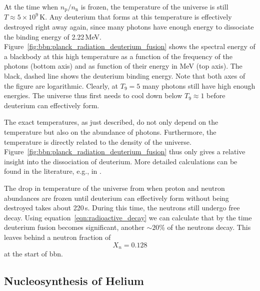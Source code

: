 At the time when $n_\mathrm{p}/n_\mathrm{n}$ is frozen, the temperature of the universe is still $T\approx 5\times 10^{9}$\,K. Any deuterium that forms at this temperature is effectively destroyed right away again, since many photons have enough energy to dissociate the binding energy of 2.22\,MeV. Figure~\ref{fig:bbn:planck_radiation_deuterium_fusion} shows the spectral energy of a blackbody at this high temperature as a function of the frequency of the photons (bottom axis) and as function of their energy in MeV (top axis). The black, dashed line shows the deuterium binding energy. Note that both axes of the figure are logarithmic. Clearly, at $T_9 = 5$ many photons still have high enough energies. The universe thus first needs to cool down below $T_9 \approx 1$ before deuterium can effectively form. 

The exact temperatures, as just described, do not only depend on the temperature but also on the abundance of photons. Furthermore, the temperature is directly related to the density of the universe. Figure~\ref{fig:bbn:planck_radiation_deuterium_fusion} thus only gives a relative insight into the dissociation of deuterium. More detailed calculations can be found in the literature, e.g., in \citet{wagoner67}.

The drop in temperature of the universe from when proton and neutron abundances are frozen until deuterium can effectively form without being destroyed takes about 220\,s. During this time, the neutrons still undergo free decay. Using equation~\eqref{eqn:radioactive_decay} we can calculate that by the time deuterium fusion becomes significant, another $\sim20$\% of the neutrons decay.
This leaves behind a neutron fraction of
\begin{equation}
    X_n = 0.128
\end{equation}
at the start of \ac{bbn}.

\subsection{Nucleosynthesis of Helium}\label{sec:bbn:nucleosynthesis_of_helium}

